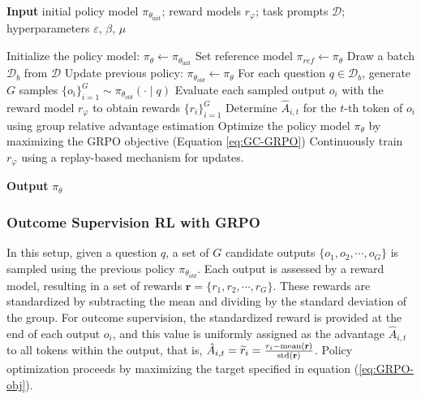 \begin{itemize}[topsep=0pt]
\begin{algorithm}[t]
  \small
  \caption{Iterative Group Relative Policy Optimization}
  \textbf{Input} initial policy model $\pi_{\theta_{\text{init}}}$; reward models $r_\varphi$; task prompts $\mathcal{D}$; 
  hyperparameters $\varepsilon$, $\beta$, $\mu$
  \begin{algorithmic}[1]
    \State Initialize the policy model: $\pi_\theta \leftarrow \pi_{\theta_{\text{init}}}$
       \State Set reference model $\pi_{ref} \leftarrow \pi_{\theta}$
      \State Draw a batch $\mathcal{D}_b$ from $\mathcal{D}$
      \State Update previous policy: $\pi_{\theta_{old}} \leftarrow \pi_{\theta}$ 
      \State For each question $q \in \mathcal{D}_b$, generate $G$ samples $\{o_i\}_{i=1}^G \sim \pi_{\theta_{old}} (\cdot \mid q) $
      \State Evaluate each sampled output $o_i$ with the reward model $r_\varphi$ to obtain rewards $\{r_i\}_{i=1}^{G}$
      \State Determine $\hat{A}_{i,t}$ for the $t$-th token of $o_i$ using group relative advantage estimation
        \State Optimize the policy model $\pi_\theta$ by maximizing the GRPO objective (Equation \ref{eq:GC-GRPO})
      \EndFor
    \EndFor \State Continuously train $r_\varphi$ using a replay-based mechanism for updates. 
    \EndFor 
  \end{algorithmic}
  \textbf{Output} $\pi_\theta$
  \label{alg:iter-grpo}
\end{algorithm}

\subsubsection{Outcome Supervision RL with GRPO} In this setup, given a question $q$, a set of $G$ candidate outputs $\{o_1, o_2, \cdots, o_G\}$ is sampled using the previous policy $\pi_{\theta_{old}}$. Each output is assessed by a reward model, resulting in a set of rewards $\mathbf{r}=\{r_1, r_2, \cdots, r_G\}$. These rewards are standardized by subtracting the mean and dividing by the standard deviation of the group. For outcome supervision, the standardized reward is provided at the end of each output $o_i$, and this value is uniformly assigned as the advantage $\hat{A}_{i, t}$ to all tokens within the output, that is, $\hat{A}_{i, t} = \widetilde{r}_i = \frac{r_i- {\rm mean}(\mathbf{r})}{{\rm std}(\mathbf{r})}$. Policy optimization proceeds by maximizing the target specified in equation (\ref{eq:GRPO-obj}).


\end{itemize}

